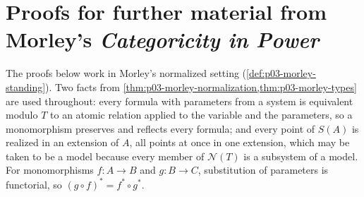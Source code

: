 \section{Proofs for further material from Morley's \emph{Categoricity in Power}}
\label{sec:annex-p03-w03-p03-033}

The proofs below work in Morley's normalized setting
(\cref{def:p03-morley-standing}). Two facts from
\cref{thm:p03-morley-normalization,thm:p03-morley-types} are used
throughout: every formula with parameters from a system is equivalent
modulo \(T\) to an atomic relation applied to the variable and the
parameters, so a monomorphism preserves and reflects every formula; and
every point of \(S(A)\) is realized in an extension of \(A\), all points
at once in one extension, which may be taken to be a model because every
member of \(\mathcal N(T)\) is a subsystem of a model. For monomorphisms
\(f:A\to B\) and \(g:B\to C\), substitution of parameters is functorial,
so \((g\circ f)^*=f^*\circ g^*\).

